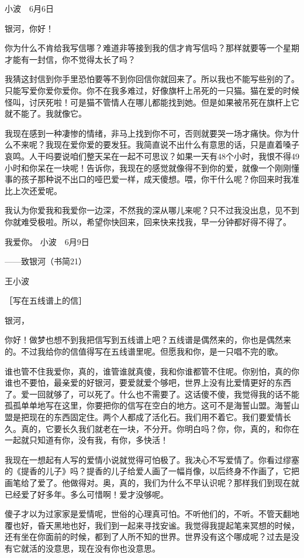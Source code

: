 小波　6月6日 

银河，你好！ 

你为什么不肯给我写信哪？难道非等接到我的信才肯写信吗？那样就要等一个星期才能有一封信，你不觉得太长了吗？ 

我猜这封信到你手里恐怕要等不到你回信你就回来了。所以我也不能写些别的了。只能写爱你爱你爱你。你不在我多难过，好像旗杆上吊死的一只猫。猫在爱的时候怪叫，讨厌死啦！可是猫不管情人在哪儿都能找到她。但是如果被吊死在旗杆上它就不能了。我就像它。 

我现在感到一种凄惨的情绪，非马上找到你不可，否则就要哭一场才痛快。你为什么不来呢？我现在爱你爱的要发狂。我简直说不出什么有意思的话，只是直着嗓子哀鸣。人干吗要说咱们整天呆在一起不可思议？如果一天有48个小时，我恨不得49小时和你呆在一块呢！告诉你，我现在的感觉就像得不到你的爱，就像一个刚刚懂事的孩子那种说不出口的哑巴爱一样，成天傻想。喂，你干什么呢？你回来时我准比上次还爱呢。 

我认为你爱我和我爱你一边深，不然我的深从哪儿来呢？只不过我没出息，见不到你就难受极啦。所以，希望你快回来，回来快来找我，早一分钟都好得不得了。 

我爱你。 小波　6月9日 





——致银河（书简21） 

王小波 

［写在五线谱上的信］　 

银河， 

你好！做梦也想不到我把信写到五线谱上吧？五线谱是偶然来的，你也是偶然来的。不过我给你的信值得写在五线谱里呢。但愿我和你，是一只唱不完的歌。 

谁也管不住我爱你，真的，谁管谁就真傻，我和你谁都管不住呢。你别怕，真的你谁也不要怕，最亲爱的好银河，要爱就爱个够吧，世界上没有比爱情更好的东西了。爱一回就够了，可以死了。什么也不需要了。这话傻不傻，我觉得我的话不能孤孤单单地写在这里，你要把你的信写在空白的地方。这可不是海誓山盟。海誓山盟是把现在的东西固定住。两个人都成了活化石。我们用不着它。我们要爱情长久。真的，它要长久我们就老在一块，不分开。你明白吗？你，你，真的，和你在一起就只知道有你，没有我，有你，多快活！ 

我现在一想起有人写的爱情小说就觉得可怕极了。我决心不写爱情了。你看过缪塞的《提香的儿子》吗？提香的儿子给爱人画了一幅肖像，以后终身不作画了，它把画笔给了爱了。他做得对。奥，真的，我们为什么不早认识呢？那样我们到现在就已经爱了好多年。多么可惜啊！爱才没够呢。 

傻子才以为过家家是爱情呢，世俗的心理真可怕。不听他们的，不听。不管天翻地覆也好，昏天黑地也好，我们到一起来寻找安谧。我觉得我提起笔来冥想的时候，还有坐在你面前的时候，都到了人所不知的世界。世界没有这个哪成呢？过去是没有它就活的没意思，现在没有你也没意思。 

